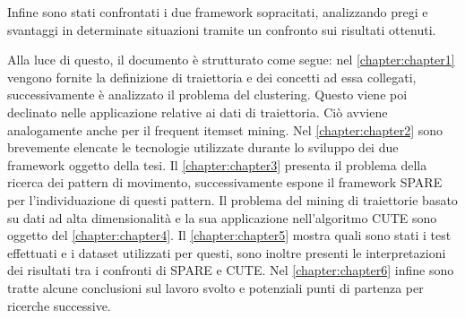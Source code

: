 Infine sono stati confrontati i due framework sopracitati, analizzando pregi e svantaggi in determinate situazioni tramite un confronto sui risultati ottenuti.

Alla luce di questo, il documento è strutturato come segue:
nel \cref{chapter:chapter1} vengono fornite la definizione di traiettoria e dei concetti ad essa collegati, successivamente è analizzato il problema del clustering.
Questo viene poi declinato nelle applicazione relative ai dati di traiettoria.
Ciò avviene analogamente anche per il frequent itemset mining.
Nel \cref{chapter:chapter2} sono brevemente elencate le tecnologie utilizzate durante lo sviluppo dei due framework oggetto della tesi.
Il \cref{chapter:chapter3} presenta il problema della ricerca dei pattern di movimento, successivamente espone il framework SPARE per l'individuazione di questi pattern.
Il problema del mining di traiettorie basato su dati ad alta dimensionalità e la sua applicazione nell'algoritmo CUTE sono oggetto del \cref{chapter:chapter4}.
Il \cref{chapter:chapter5} mostra quali sono stati i test effettuati e i dataset utilizzati per questi, sono inoltre presenti le interpretazioni dei risultati tra i confronti di SPARE e CUTE.
Nel \cref{chapter:chapter6} infine sono tratte alcune conclusioni sul lavoro svolto e potenziali punti di partenza per ricerche successive.